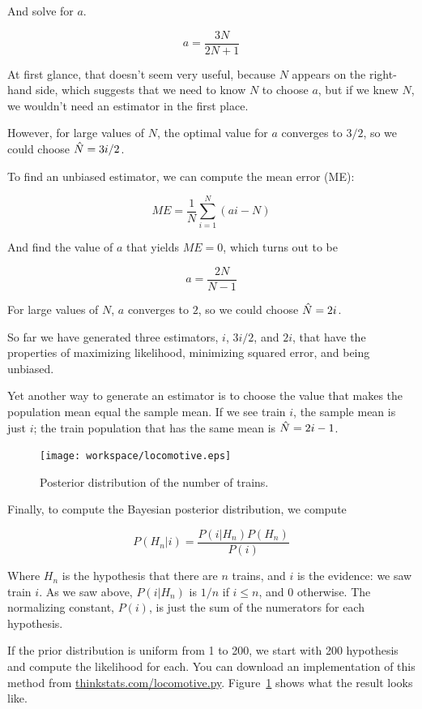 \documentclass[12pt]{book}
\begin{document}
And solve for $a$.

\[ a = \frac{3N}{2N+1} \]

At first glance, that doesn't seem very useful, because $N$ appears on
the right-hand side, which suggests that we need to know $N$ to choose
$a$, but if we knew $N$, we wouldn't need an estimator in the first place.

However, for large values of $N$, the optimal value for $a$ converges
to $3/2$, so we could choose $\hat{N} = 3i / 2$.

To find an unbiased estimator, we can compute the mean error (ME):

\[ ME = \frac{1}{N} \sum_{i=1}^N (ai - N) \]

And find the value of $a$ that yields $ME = 0$, which turns out to be

\[ a = \frac{2N}{N-1}\]

For large values of $N$, $a$ converges to $2$, so we could choose
$\hat{N} = 2i$.

So far we have generated three estimators, $i$, $3i/2$, and $2i$,
that have the properties of maximizing likelihood, minimizing squared
error, and being unbiased.

Yet another way to generate an estimator is to choose the value
that makes the population mean equal the sample mean.  If we see train
$i$, the sample mean is just $i$; the train population that has the
same mean is $\hat{N} = 2i - 1$.

\begin{figure}
\centerline{\texttt{[image: workspace/locomotive.eps]}}
\caption{Posterior distribution of the number of trains.}
\label{locomotive}
\end{figure}

Finally, to compute the Bayesian posterior distribution, we compute

\[ P(H_n|i) = \frac{P(i|H_n) P(H_n)}{P(i)} \]

Where $H_n$ is the hypothesis that there are $n$ trains, and $i$ is
the evidence: we saw train $i$.  As we saw above, $P(i|H_n)$
is $1/n$ if $i \le n$, and 0 otherwise.  The normalizing constant,
$P(i)$, is just the sum of the numerators for each hypothesis.

If the prior distribution is uniform from 1 to 200, we start with 200
hypothesis and compute the likelihood for each.  You can download an
implementation of this method from
\url{thinkstats.com/locomotive.py}.  Figure~\ref{locomotive} shows
what the result looks like.
\end{document}
